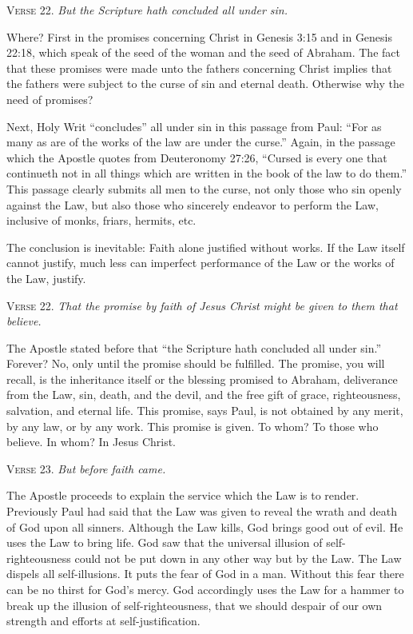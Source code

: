 \textsc{Verse} 22. \emph{But the Scripture hath concluded all under sin.}

Where? First in the promises concerning Christ in Genesis 3:15 and in Genesis 22:18, which speak of the seed of the woman and the seed of Abraham. The fact that these promises were made unto the fathers concerning Christ implies that the fathers were subject to the curse of sin and eternal death. Otherwise why the need of promises?

Next, Holy Writ “concludes” all under sin in this passage from Paul: “For as many as are of the works of the law are under the curse.” Again, in the passage which the Apostle quotes from Deuteronomy 27:26, “Cursed is every one that continueth not in all things which are written in the book of the law to do them.” This passage clearly submits all men to the curse, not only those who sin openly against the Law, but also those who sincerely endeavor to perform the Law, inclusive of monks, friars, hermits, etc.

The conclusion is inevitable: Faith alone justified without works. If the Law itself cannot justify, much less can imperfect performance of the Law or the works of the Law, justify.

\textsc{Verse} 22. \emph{That the promise by faith of Jesus Christ might be given to them that believe.}

The Apostle stated before that “the Scripture hath concluded all under sin.” Forever? No, only until the promise should be fulfilled. The promise, you will recall, is the inheritance itself or the blessing promised to Abraham, deliverance from the Law, sin, death, and the devil, and the free gift of grace, righteousness, salvation, and eternal life. This promise, says Paul, is not obtained by any merit, by any law, or by any work. This promise is given. To whom? To those who believe. In whom? In Jesus Christ.

\textsc{Verse} 23. \emph{But before faith came.}

The Apostle proceeds to explain the service which the Law is to render. Previously Paul had said that the Law was given to reveal the wrath and death of God upon all sinners. Although the Law kills, God brings good out of evil. He uses the Law to bring life. God saw that the universal illusion of self-righteousness could not be put down in any other way but by the Law. The Law dispels all self-illusions. It puts the fear of God in a man. Without this fear there can be no thirst for God’s mercy. God accordingly uses the Law for a hammer to break up the illusion of self-righteousness, that we should despair of our own strength and efforts at self-justification.

